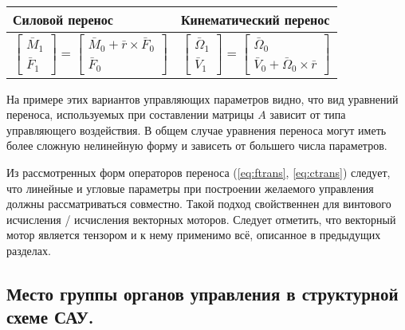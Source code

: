 \documentclass[a4paper]{article}
\begin{document}
\begin{table}[ht]
	\centering
	\begin{tabular}{| p{7cm} | p{7cm} |}
		\hline
		Силовой перенос & Кинематический перенос \\
		\hline
		\begin{equation} \label{eq:ftrans}
		\begin{bmatrix} \bar{M}_1 \\ \bar{F}_1 \end{bmatrix} 
			= \begin{bmatrix} \bar{M}_0 + \bar{r} \times \bar{F}_0 \\ \bar{F}_0 \end{bmatrix}
		\end{equation}
		&
		\begin{equation} \label{eq:ctrans}
		\begin{bmatrix} \bar{\Omega}_1 \\ \bar{V}_1 \end{bmatrix} 
			= \begin{bmatrix} \bar{\Omega}_0 \\ \bar{V}_0 + \bar{\Omega}_0 \times \bar{r} \end{bmatrix}
		\end{equation}\\
		
		\hline
	\end{tabular}
\end{table}

На примере этих вариантов управляющих параметров видно, что вид уравнений переноса, используемых при составлении матрицы $A$ зависит от типа управляющего воздействия. В общем случае уравнения переноса могут иметь более сложную нелинейную форму и зависеть от большего числа параметров. 

Из рассмотренных форм операторов переноса (\ref{eq:ftrans}, \ref{eq:ctrans}) следует, что линейные и угловые параметры при построении желаемого управления должны рассматриваться совместно. Такой подход свойственнен для винтового исчисления / исчисления векторных моторов. Следует отметить, что векторный мотор является тензором и к нему применимо всё, описанное в предыдущих разделах.  

\subsection{Место группы органов управления в структурной схеме САУ.}
\end{document}
